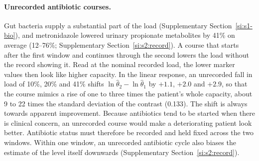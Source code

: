 \paragraph{Unrecorded antibiotic courses.} Gut bacteria supply a substantial part of the load
(Supplementary Section~\ref{si:s1-bio}), and metronidazole lowered urinary propionate metabolites
by 41\% on average (12--76\%; Supplementary Section~\ref{si:s2:record}). A course that starts after
the first window and continues through the second lowers the load without the record showing it.
Read at the nominal recorded load, the lower marker values then look like higher capacity. In the
linear response, an unrecorded fall in load of 10\%, 20\% and 41\% shifts
$\ln\hat\theta_2-\ln\hat\theta_1$ by $+1.1$, $+2.0$ and $+2.9$, so that the course mimics a rise
of one to three times the patient's whole capacity, about 9 to 22 times the standard deviation of
the contrast (0.133). The shift is always towards apparent improvement.
Because antibiotics tend to be started when there is clinical concern, an unrecorded course would
make a deteriorating patient look better. Antibiotic status must therefore be recorded and held
fixed across the two windows. Within one window, an unrecorded antibiotic cycle also biases the
estimate of the level itself downwards (Supplementary Section~\ref{si:s2:record}).

